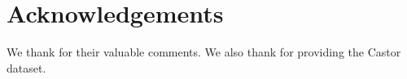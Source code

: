 \documentclass{sig-alternate}
\begin{document}



\section{Acknowledgements}

We thank \phantom{Chia-Tche Chang, Le Thanh Dung Nguyen and especially Antoine Amarilli} for their valuable comments. We also thank \phantom{Mathias Hiron} for providing the Castor dataset.

%

%
%

\end{document}
